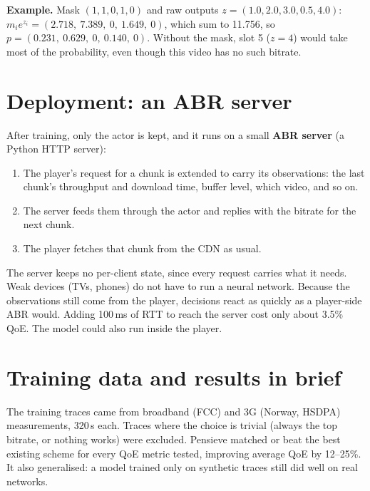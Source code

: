 \textbf{Example.} Mask $(1,1,0,1,0)$ and raw outputs $z = (1.0, 2.0, 3.0, 0.5, 4.0)$:
$m_i e^{z_i} = (2.718,\ 7.389,\ 0,\ 1.649,\ 0)$, which sum to 11.756, so $p = (0.231,\ 0.629,\ 0,\ 0.140,\ 0)$.
Without the mask, slot 5 ($z = 4$) would take most of the probability, even though this video has no such bitrate.

\section{Deployment: an ABR server}
After training, only the actor is kept, and it runs on a small \textbf{ABR server} (a Python HTTP server):
\begin{enumerate}
  \item The player's request for a chunk is extended to carry its observations: the last chunk's throughput and download time, buffer level, which video, and so on.
  \item The server feeds them through the actor and replies with the bitrate for the next chunk.
  \item The player fetches that chunk from the CDN as usual.
\end{enumerate}
The server keeps no per-client state, since every request carries what it needs. Weak devices (TVs, phones) do not have to run a neural network. Because the
observations still come from the player, decisions react as quickly as a player-side ABR would. Adding 100\,ms of RTT to reach the server cost only
about 3.5\% QoE. The model could also run inside the player.

\section{Training data and results in brief}
The training traces came from broadband (FCC) and 3G (Norway, HSDPA) measurements, 320\,s each. Traces where the choice is trivial (always the top
bitrate, or nothing works) were excluded. Pensieve matched or beat the best existing scheme for every QoE metric tested, improving average QoE by
12--25\%. It also generalised: a model trained only on synthetic traces still did well on real networks.

